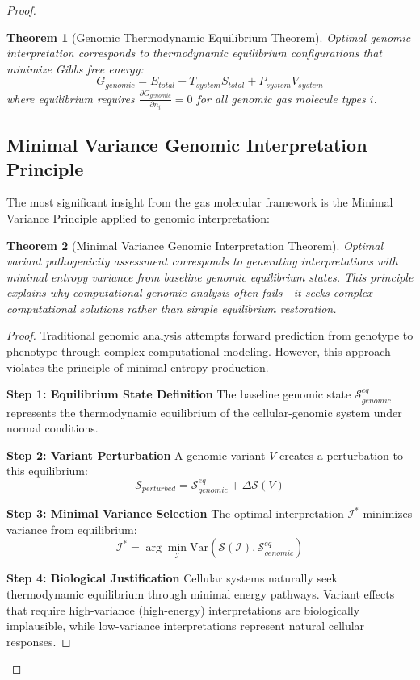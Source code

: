 \documentclass[12pt,a4paper]{article}
\newtheorem{theorem}{Theorem}[section]
\begin{document}
\begin{proof}
\begin{theorem}[Genomic Thermodynamic Equilibrium Theorem]
Optimal genomic interpretation corresponds to thermodynamic equilibrium configurations that minimize Gibbs free energy:
$$G_{genomic} = E_{total} - T_{system} S_{total} + P_{system} V_{system}$$
where equilibrium requires $\frac{\partial G_{genomic}}{\partial n_i} = 0$ for all genomic gas molecule types $i$.
\end{theorem}

\subsection{Minimal Variance Genomic Interpretation Principle}

The most significant insight from the gas molecular framework is the Minimal Variance Principle applied to genomic interpretation:

\begin{theorem}[Minimal Variance Genomic Interpretation Theorem]
Optimal variant pathogenicity assessment corresponds to generating interpretations with minimal entropy variance from baseline genomic equilibrium states. This principle explains why computational genomic analysis often fails—it seeks complex computational solutions rather than simple equilibrium restoration.
\end{theorem}

\begin{proof}
Traditional genomic analysis attempts forward prediction from genotype to phenotype through complex computational modeling. However, this approach violates the principle of minimal entropy production.

\textbf{Step 1: Equilibrium State Definition}
The baseline genomic state $\mathcal{S}_{genomic}^{eq}$ represents the thermodynamic equilibrium of the cellular-genomic system under normal conditions.

\textbf{Step 2: Variant Perturbation}
A genomic variant $V$ creates a perturbation to this equilibrium:
$$\mathcal{S}_{perturbed} = \mathcal{S}_{genomic}^{eq} + \Delta\mathcal{S}(V)$$

\textbf{Step 3: Minimal Variance Selection}
The optimal interpretation $\mathcal{I}^*$ minimizes variance from equilibrium:
$$\mathcal{I}^* = \arg\min_{\mathcal{I}} \text{Var}(\mathcal{S}(\mathcal{I}), \mathcal{S}_{genomic}^{eq})$$

\textbf{Step 4: Biological Justification}
Cellular systems naturally seek thermodynamic equilibrium through minimal energy pathways. Variant effects that require high-variance (high-energy) interpretations are biologically implausible, while low-variance interpretations represent natural cellular responses.


\end{proof}
\end{proof}
\end{document}
